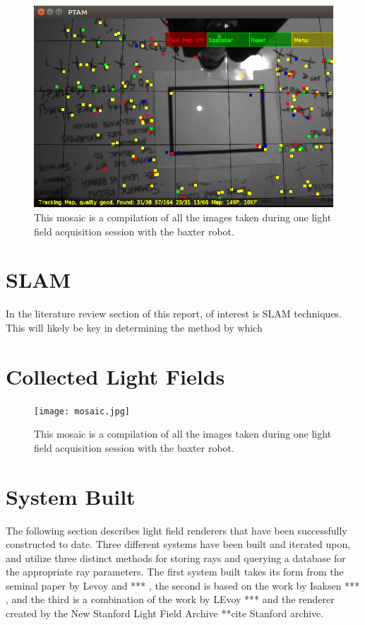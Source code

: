 \documentclass[12pt]{report}
\begin{document}
\begin{figure}[!ht]
	\centering
	\includegraphics[scale=0.55]{experiment_image.png}
	\caption{This mosaic is a compilation of all the images taken during one light field acquisition session with the baxter robot.}
	\label{fig:bax_ptam_std_dev}
\end{figure}

\section*{SLAM}
In the literature review section of this report, of interest is SLAM techniques. This will likely be key in determining the method by which 

\section*{Collected Light Fields}

\begin{figure}[!ht]
	\centering
	\texttt{[image: mosaic.jpg]}
	\caption{This mosaic is a compilation of all the images taken during one light field acquisition session with the baxter robot.}
	\label{fig:nau_collected_images}
\end{figure}

\section*{System Built}
The following section describes light field renderers that have been successfully constructed to date. Three different systems have been built and iterated upon, and utilize three distinct methods for storing rays and querying a database for the appropriate ray parameters. The first system built takes its form from the seminal paper by Levoy and *** \cite{Levoy96}, the second is based on the work by Isaksen *** \cite{Isaksen01}, and the third is a combination of the work by LEvoy *** and the renderer created by the New Stanford Light Field Archive \cite{lfArchive} **cite Stanford archive.
\end{document}
